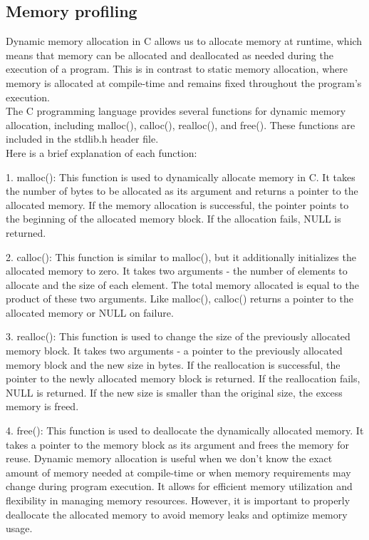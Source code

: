 \documentclass[12pt]{article}
\begin{document}
\subsection{Memory profiling}

Dynamic memory allocation in C allows us to allocate memory at runtime, which means that memory can be allocated and deallocated as needed during the execution of a program. This is in contrast to static memory allocation, where memory is allocated at compile-time and remains fixed throughout the program's execution.\\
The C programming language provides several functions for dynamic memory allocation, including malloc(), calloc(), realloc(), and free(). These functions are included in the stdlib.h header file.\\
Here is a brief explanation of each function:



1. malloc(): This function is used to dynamically allocate memory in C. It takes the number of bytes to be allocated as its argument and returns a pointer to the allocated memory. If the memory allocation is successful, the pointer points to the beginning of the allocated memory block. If the allocation fails, NULL is returned.



2. calloc(): This function is similar to malloc(), but it additionally initializes the allocated memory to zero. It takes two arguments - the number of elements to allocate and the size of each element. The total memory allocated is equal to the product of these two arguments. Like malloc(), calloc() returns a pointer to the allocated memory or NULL on failure.



3. realloc(): This function is used to change the size of the previously allocated memory block. It takes two arguments - a pointer to the previously allocated memory block and the new size in bytes. If the reallocation is successful, the pointer to the newly allocated memory block is returned. If the reallocation fails, NULL is returned. If the new size is smaller than the original size, the excess memory is freed.



4. free(): This function is used to deallocate the dynamically allocated memory. It takes a pointer to the memory block as its argument and frees the memory for reuse.\vspace{.1 in}
Dynamic memory allocation is useful when we don't know the exact amount of memory needed at compile-time or when memory requirements may change during program execution. It allows for efficient memory utilization and flexibility in managing memory resources. However, it is important to properly deallocate the allocated memory to avoid memory leaks and optimize memory usage.
\end{document}
